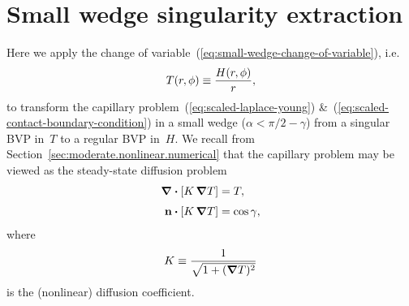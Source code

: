 \chapter{Small wedge singularity extraction}
\label{ch:extraction}

Here we apply the change of variable~(\ref{eq:small-wedge-change-of-variable}),
i.e.
\begin{equation}
  T (r, \phi) \equiv \frac{H (r, \phi)}{r},
  \label{eq:small-wedge-change-of-variable-appendix}
\end{equation}
to transform the capillary problem~(\ref{eq:scaled-laplace-young})
\&~(\ref{eq:scaled-contact-boundary-condition})
in a small wedge ($\alpha < \pi/2 - \gamma$)
from a singular BVP in~$T$
to a regular BVP in~$H$.
We recall from Section~\ref{sec:moderate.nonlinear.numerical}
that the capillary problem may be viewed
as the steady-state diffusion problem
\begin{align}
  \del \dotp \squarebr{K \del T} &= T,
    \label{eq:laplace-young-diffusion-appendix}
    \\[\tallspace]
  \normalvec \dotp \squarebr{K \del T} &= \cos\gamma,
  \label{eq:contact-boundary-condition-diffusion-appendix}
\end{align}
where
\begin{equation}
  K \equiv \frac{1}{\sqrt{1 + (\mathop{}\!\boldsymbol{\mathbf{\nabla}} T)^2}}
  \label{eq:laplace-young-diffusion-coefficient-appendix}
\end{equation}
is the (nonlinear) diffusion coefficient.

